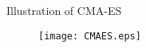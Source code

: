 \begin{frame}{Illustration of CMA-ES}
  \begin{figure}[t]
    \texttt{[image: CMAES.eps]}
  \end{figure}
\end{frame}

